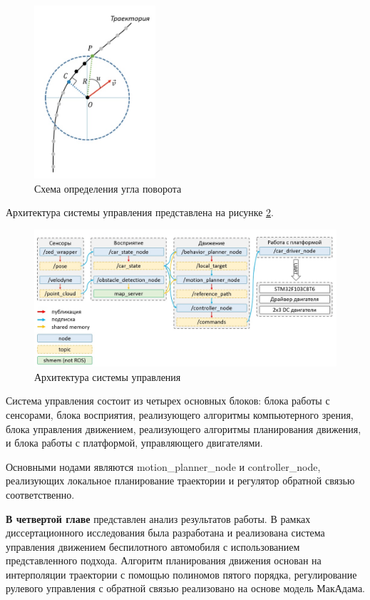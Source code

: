 \begin{figure}[h]
	\centering
	\includegraphics[width=0.4\textwidth]{images/path_moving}
	\caption{Схема определения угла поворота}
	\label{img:path_moving}
\end{figure}


Архитектура системы управления представлена на рисунке \ref{img:ros_arch}.

\begin{figure}[h]
    \centering
    \includegraphics[width=\textwidth]{images/ros_arch}
    \caption{Архитектура системы управления}
    \label{img:ros_arch}
\end{figure}

Система управления состоит из четырех основных блоков: блока работы с сенсорами, блока восприятия,
реализующего алгоритмы компьютерного зрения, блока управления движением, реализующего алгоритмы
планирования движения, и блока работы с платформой, управляющего двигателями.

Основными нодами являются motion\_planner\_node и controller\_node, реализующих локальное планирование
траектории и регулятор обратной связью соответственно.

\textbf{В четвертой главе} представлен анализ результатов работы. В рамках диссертационного исследования
была разработана и реализована система управления движением беспилотного автомобиля с использованием
представленного подхода. Алгоритм планирования движения основан на интерполяции траектории с помощью
полиномов пятого порядка, регулирование рулевого управления с обратной связью реализовано на основе
модель МакАдама.

